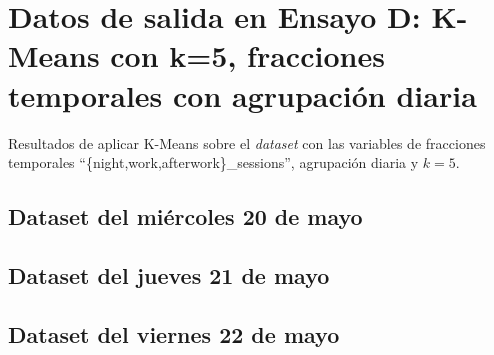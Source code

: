 \chapter{Datos de salida en Ensayo D: K-Means con k=5, fracciones temporales con agrupación diaria}\label{app:ensayoD}

Resultados de aplicar K-Means sobre el \emph{dataset} con las variables de fracciones temporales ``\{night,work,afterwork\}\_sessions'', agrupación diaria y $k=5$.

\section{Dataset del miércoles 20 de mayo}


\section{Dataset del jueves 21 de mayo}


\section{Dataset del viernes 22 de mayo}

